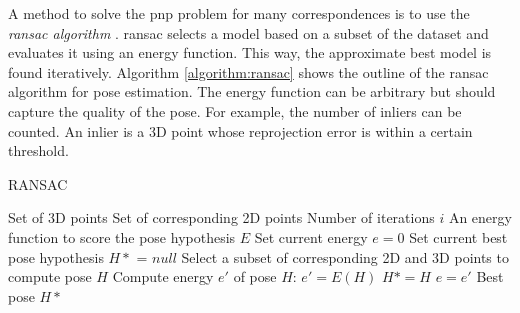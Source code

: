 A method to solve the \gls{pnp} problem for many correspondences is to use the \textit{\gls{ransac} algorithm} \cite{ransac}. \gls{ransac} selects a model based on a subset of the dataset and evaluates it using an energy function. This way, the approximate best model is found iteratively. Algorithm \ref{algorithm:ransac} shows the outline of the \gls{ransac} algorithm for pose estimation. The energy function can be arbitrary but should capture the quality of the pose. For example, the number of inliers can be counted. An inlier is a 3D point whose reprojection error is within a certain threshold.

\begin{algorithm}
\caption{RANSAC} \label{algorithm:ransac}
\begin{algorithmic} 
\REQUIRE Set of 3D points
\REQUIRE Set of corresponding 2D points
\REQUIRE Number of iterations $i$
\REQUIRE An energy function to score the pose hypothesis $E$
\STATE Set current energy $e=0$
\STATE Set current best pose hypothesis $H*$ = $null$
\STATE Select a subset of corresponding 2D and 3D points to compute pose $H$
\STATE Compute energy $e'$ of pose $H$: $e'=E(H)$
\STATE $H* = H$
\STATE $e = e'$
\ENDIF
\ENDFOR
\RETURN Best pose $H*$
\end{algorithmic}
\end{algorithm}